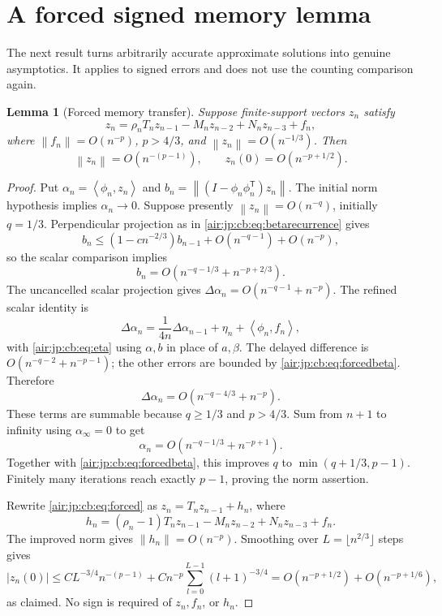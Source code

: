\documentclass[11pt,letterpaper]{article}
\numberwithin{equation}{section}
\newtheorem{lemma}[theorem]{Lemma}
\theoremstyle{remark}
\newcommand{\norm}[1]{\left\lVert#1\right\rVert}
\newcommand{\ip}[2]{\left\langle#1,#2\right\rangle}
\begin{document}
\section{A forced signed memory lemma}\label{air:jp:cb:sec:forced}
The next result turns arbitrarily accurate approximate solutions into genuine asymptotics. It applies to signed errors and does not use the counting comparison again.
\begin{lemma}[Forced memory transfer]\label{air:jp:cb:lem:forced}
Suppose finite-support vectors $z_n$ satisfy
\begin{equation}\label{air:jp:cb:eq:forced}
 z_n=\rho_nT_nz_{n-1}-M_nz_{n-2}+N_nz_{n-3}+f_n,
\end{equation}
where $\norm{f_n}=O(n^{-p})$, $p>4/3$, and $\norm{z_n}=O(n^{-1/3})$. Then
\begin{equation}\label{air:jp:cb:eq:forcedconclusion}
 \norm{z_n}=O(n^{-(p-1)}),\qquad z_n(0)=O(n^{-p+1/2}).
\end{equation}
\end{lemma}
\begin{proof}
Put $\alpha_n=\ip{\phi_n}{z_n}$ and $b_n=\norm{(I-\phi_n\phi_n^{\mathsf T})z_n}$. The initial norm hypothesis implies $\alpha_n\to0$. Suppose presently $\norm{z_n}=O(n^{-q})$, initially $q=1/3$. Perpendicular projection as in \eqref{air:jp:cb:eq:betarecurrence} gives
\[
 b_n\le(1-cn^{-2/3})b_{n-1}+O(n^{-q-1})+O(n^{-p}),
\]
so the scalar comparison implies
\begin{equation}\label{air:jp:cb:eq:forcedbeta}
 b_n=O(n^{-q-1/3}+n^{-p+2/3}).
\end{equation}
The uncancelled scalar projection gives $\Delta\alpha_n=O(n^{-q-1}+n^{-p})$. The refined scalar identity is
\[
 \Delta\alpha_n=\frac1{4n}\Delta\alpha_{n-1}+\eta_n+\ip{\phi_n}{f_n},
\]
with \eqref{air:jp:cb:eq:eta} using $\alpha,b$ in place of $a,\beta$. The delayed difference is $O(n^{-q-2}+n^{-p-1})$; the other errors are bounded by \eqref{air:jp:cb:eq:forcedbeta}. Therefore
\[
 \Delta\alpha_n=O(n^{-q-4/3}+n^{-p}).
\]
These terms are summable because $q\ge1/3$ and $p>4/3$. Sum from $n+1$ to infinity using $\alpha_\infty=0$ to get
\[
 \alpha_n=O(n^{-q-1/3}+n^{-p+1}).
\]
Together with \eqref{air:jp:cb:eq:forcedbeta}, this improves $q$ to $\min(q+1/3,p-1)$. Finitely many iterations reach exactly $p-1$, proving the norm assertion.

Rewrite \eqref{air:jp:cb:eq:forced} as $z_n=T_nz_{n-1}+h_n$, where
\[
 h_n=(\rho_n-1)T_nz_{n-1}-M_nz_{n-2}+N_nz_{n-3}+f_n.
\]
The improved norm gives $\norm{h_n}=O(n^{-p})$. Smoothing over $L=\lfloor n^{2/3}\rfloor$ steps gives
\[
 |z_n(0)|\le CL^{-3/4}n^{-(p-1)}
  +Cn^{-p}\sum_{l=0}^{L-1}(l+1)^{-3/4}
 =O(n^{-p+1/2})+O(n^{-p+1/6}),
\]
as claimed. No sign is required of $z_n,f_n$, or $h_n$.
\end{proof}
\end{document}
